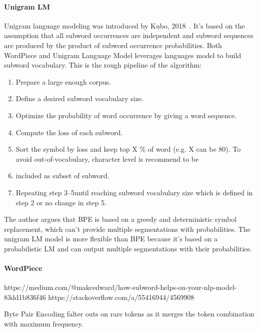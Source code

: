 \paragraph{Unigram LM}

Unigram language modeling was introduced by Kubo, 2018~\cite{kudo-2018-subword}. It's based on the assumption that all subword occurrences are independent and subword sequences are produced by the product of subword occurrence probabilities. Both WordPiece and Unigram Language Model leverages languages model to build subword vocabulary. This is the rough pipeline of the algorithm:

\begin{enumerate}
    \item Prepare a large enough corpus.
    \item Define a desired subword vocabulary size.
    \item Optimize the probability of word occurrence by giving a word sequence.
    \item Compute the loss of each subword.
    \item Sort the symbol by loss and keep top X \% of word (e.g. X can be 80). To avoid out-of-vocabulary, character level is recommend to be \item included as subset of subword.
    \item Repeating step 3–5until reaching subword vocabulary size which is defined in step 2 or no change in step 5.
\end{enumerate}

The author argues that BPE is based on a greedy and deterministic symbol replacement, which can't provide multiple segmentations with probabilities. The unigram LM model is more flexible than BPE because it's based on a probabilistic LM and can output multiple segmentations with their probabilities.

\paragraph{WordPiece}

https://medium.com/@makcedward/how-subword-helps-on-your-nlp-model-83dd1b836f46
https://stackoverflow.com/a/55416944/4569908

Byte Pair Encoding falter outs on rare tokens as it merges the token combination with maximum frequency.

